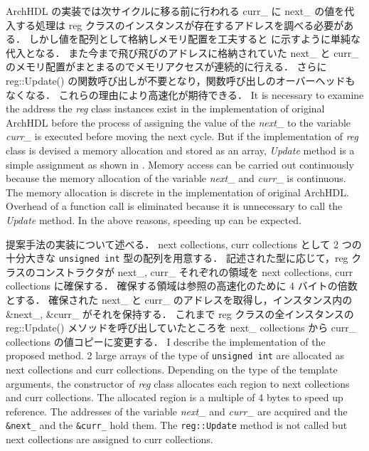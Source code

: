 ArchHDL の実装では次サイクルに移る前に行われる curr\_ に next\_ の値を代入する処理は
reg クラスのインスタンスが存在するアドレスを調べる必要がある．
しかし値を配列として格納しメモリ配置を工夫すると に示すように単純な代入となる．
また今まで飛び飛びのアドレスに格納されていた next\_ と curr\_ のメモリ配置がまとまるのでメモリアクセスが連続的に行える．
さらに reg::Update() の関数呼び出しが不要となり，関数呼び出しのオーバーヘッドもなくなる．
これらの理由により高速化が期待できる．
\fi
It is necessary to examine the address the \textit{reg} class instances exist in the implementation of original ArchHDL
before the process of assigning the value of the \textit{next\_} to the variable \textit{curr\_} is executed before moving the next cycle.
But if the implementation of \textit{reg} class is devised a memory allocation and stored as an array, \textit{Update} method is a simple assignment as shown in .
Memory access can be carried out continuously
because the memory allocation of the variable \textit{next\_} and \textit{curr\_} is continuous.
The memory allocation is discrete in the implementation of original ArchHDL.
Overhead of a function call is eliminated
because it is unnecessary to call the \textit{Update} method.
In the above reasons, speeding up can be expected.

提案手法の実装について述べる．
next collections, curr collections として 2 つの十分大きな \verb/unsigned int/ 型の配列を用意する．
記述された型に応じて，reg クラスのコンストラクタが next\_, curr\_ それぞれの領域を next collections, curr collections に確保する．
確保する領域は参照の高速化のために 4 バイトの倍数とする．
確保された next\_ と curr\_ のアドレスを取得し，インスタンス内の \&next\_, \&curr\_ がそれを保持する．
これまで reg クラスの全インスタンスの reg::Update() メソッドを呼び出していたところを next\_ collections から curr\_ collections の値コピーに変更する．
\fi
I describe the implementation of the proposed method.
2 large arrays of the type of \verb/unsigned int/ are allocated as next collections and curr collections.
Depending on the type of the template arguments, the constructor of \textit{reg} class allocates each region to next collections and curr collections.
The allocated region is a multiple of 4 bytes to speed up reference.
The addresses of the variable \textit{next\_} and \textit{curr\_} are acquired and
the \texttt{\&next\_} and the \texttt{\&curr\_} hold them.
The \texttt{reg::Update} method is not called
but next collections are assigned to curr collections.


